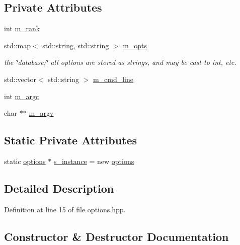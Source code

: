 \subsection*{Private Attributes}
\begin{DoxyCompactItemize}
\item 
int \hyperlink{classoptions_a3171bb61cdfcc5a6a899ad6fe9b56f9d}{m\+\_\+rank}
\item 
std\+::map$<$ std\+::string, std\+::string $>$ \hyperlink{classoptions_ac73507ca925d98ee5ff6f04937dff5c3}{m\+\_\+opts}
\begin{DoxyCompactList}\small\item\em the \char`\"{}database;\char`\"{} all options are stored as strings, and may be cast to int, etc. \end{DoxyCompactList}\item 
std\+::vector$<$ std\+::string $>$ \hyperlink{classoptions_a64ad628e508d5d71a117909e44f68350}{m\+\_\+cmd\+\_\+line}
\item 
int \hyperlink{classoptions_a5df2188c2d1bb81cbebef4b2e80a926f}{m\+\_\+argc}
\item 
char $\ast$$\ast$ \hyperlink{classoptions_a376f7dcfec6a2ff75835c3c3d732bdea}{m\+\_\+argv}
\end{DoxyCompactItemize}
\subsection*{Static Private Attributes}
\begin{DoxyCompactItemize}
\item 
static \hyperlink{classoptions}{options} $\ast$ \hyperlink{classoptions_ab10ed8295e9333b025619195d156a9ed}{s\+\_\+instance} = new \hyperlink{classoptions}{options}
\end{DoxyCompactItemize}


\subsection{Detailed Description}


Definition at line 15 of file options.\+hpp.



\subsection{Constructor \& Destructor Documentation}
\mbox{\label{classoptions_a41a256b4ba3b2d68a2d72b9245aa0c4d}} 
